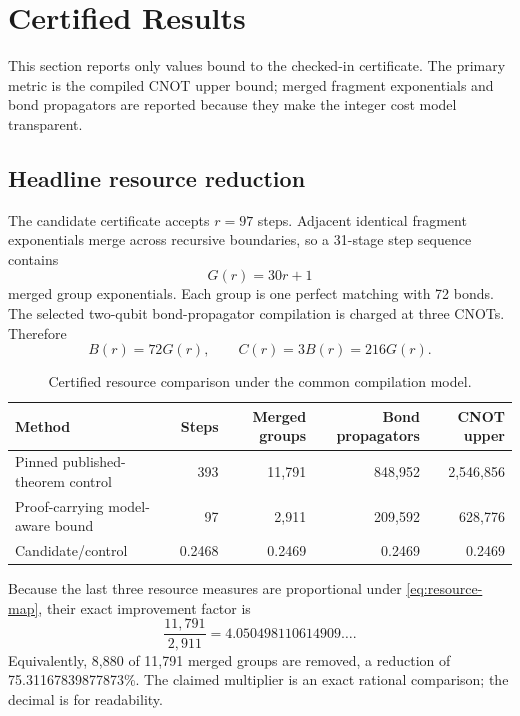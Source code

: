 \section{Certified Results}
\label{sec:results}

This section reports only values bound to the checked-in certificate.  The
primary metric is the compiled CNOT upper bound; merged fragment
exponentials and bond propagators are reported because they make the integer
cost model transparent.

\subsection{Headline resource reduction}

The candidate certificate accepts $r=97$ steps.  Adjacent identical fragment
exponentials merge across recursive boundaries, so a 31-stage step sequence
contains
\begin{equation}
  G(r)=30r+1
  \label{eq:merged-groups}
\end{equation}
merged group exponentials.  Each group is one perfect matching with 72 bonds.
The selected two-qubit bond-propagator compilation is charged at three CNOTs.
Therefore
\begin{equation}
  B(r)=72G(r),\qquad C(r)=3B(r)=216G(r).
  \label{eq:resource-map}
\end{equation}

\begin{table}[t]
\centering
\caption{Certified resource comparison under the common compilation model.}
\label{tab:headline-results}
\begin{tabular}{@{}lrrrr@{}}
\toprule
Method & Steps & Merged groups & Bond propagators & CNOT upper \\
\midrule
Pinned published-theorem control & 393 & 11,791 & 848,952 & 2,546,856 \\
Proof-carrying model-aware bound & 97 & 2,911 & 209,592 & 628,776 \\
\midrule
Candidate/control & 0.2468 & 0.2469 & 0.2469 & 0.2469 \\
\bottomrule
\end{tabular}
\end{table}

Because the last three resource measures are proportional under
\cref{eq:resource-map}, their exact improvement factor is
\begin{equation}
  \frac{11{,}791}{2{,}911}=4.050498110614909\ldots.
  \label{eq:exact-ratio}
\end{equation}
Equivalently, 8,880 of 11,791 merged groups are removed, a reduction of
75.31167839877873\%.  The claimed multiplier is an exact rational comparison;
the decimal is for readability.

